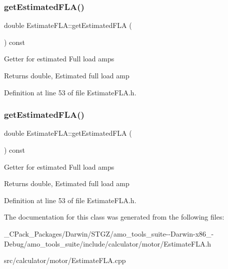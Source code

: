 \subsubsection{\texorpdfstring{get\+Estimated\+F\+L\+A()}{getEstimatedFLA()}\hspace{0.1cm}{\footnotesize\ttfamily [2/3]}}
{\footnotesize\ttfamily double Estimate\+F\+L\+A\+::get\+Estimated\+F\+LA (\begin{DoxyParamCaption}{ }\end{DoxyParamCaption}) const\hspace{0.3cm}{\ttfamily [inline]}}

Getter for estimated Full load amps \begin{DoxyReturn}{Returns}
double, Estimated full load amp 
\end{DoxyReturn}


Definition at line 53 of file Estimate\+F\+L\+A.\+h.

\mbox{\label{class_estimate_f_l_a_adcb6eef313c8184f52b9ca038fbeddaa}} 
\subsubsection{\texorpdfstring{get\+Estimated\+F\+L\+A()}{getEstimatedFLA()}\hspace{0.1cm}{\footnotesize\ttfamily [3/3]}}
{\footnotesize\ttfamily double Estimate\+F\+L\+A\+::get\+Estimated\+F\+LA (\begin{DoxyParamCaption}{ }\end{DoxyParamCaption}) const\hspace{0.3cm}{\ttfamily [inline]}}

Getter for estimated Full load amps \begin{DoxyReturn}{Returns}
double, Estimated full load amp 
\end{DoxyReturn}


Definition at line 53 of file Estimate\+F\+L\+A.\+h.



The documentation for this class was generated from the following files\+:\begin{DoxyCompactItemize}
\item 
\+\_\+\+C\+Pack\+\_\+\+Packages/\+Darwin/\+S\+T\+G\+Z/amo\+\_\+tools\+\_\+suite-\/-\/\+Darwin-\/x86\+\_-\/\+Debug/amo\+\_\+tools\+\_\+suite/include/calculator/motor/Estimate\+F\+L\+A.\+h\item 
src/calculator/motor/Estimate\+F\+L\+A.\+cpp\end{DoxyCompactItemize}

